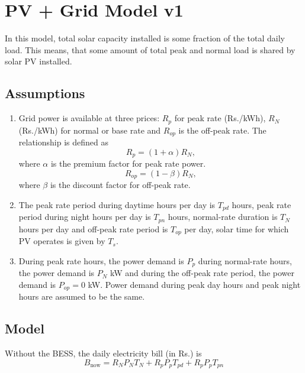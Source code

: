 \documentclass{article}
\begin{document}
\section{PV + Grid Model v1}

In this model, total solar capacity installed is some fraction of the total daily load. This means, that some amount of total peak and normal load is shared by solar PV installed.

\subsection{Assumptions}
\begin{enumerate}
    \item Grid power is available at three prices: \( R_p \) for peak rate (Rs./kWh), \( R_N \) (Rs./kWh) for normal or base rate and \( R_{op} \) is the off-peak rate. The relationship is defined as
    \[
    R_p = (1 + \alpha) R_N,
    \]
    where \( \alpha \) is the premium factor for peak rate power.
    \[
    R_{op} = (1 - \beta) R_N,    
    \]
    where \( \beta \) is the discount factor for off-peak rate.

    \item The peak rate period during daytime hours per day is \( T_{pd} \) hours, peak rate period during night hours per day is \( T_{pn} \) hours, normal-rate duration
    is \( T_N \) hours per day and off-peak rate period is  \( T_{op} \) per day, solar time for which PV operates is given by \( T_s \).

    \item During peak rate hours, the power demand is \( P_p \)  during normal-rate hours, the power demand is \( P_N \) kW and during the off-peak rate period, the power demand is \( P_{op} = 0\) kW. Power demand during peak day hours and peak night hours are assumed to be the same.

\end{enumerate}

\subsection{Model}
Without the BESS, the daily electricity bill (in Rs.) is
\[
B_{\text{now}} = R_N P_N T_N + R_p P_{p} T_{pd} + R_p P_{p} T_{pn}
\]
\end{document}
